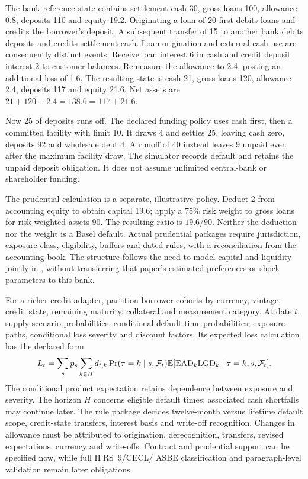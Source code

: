 The bank reference state contains settlement cash 30, gross loans 100,
allowance 0.8, deposits 110 and equity 19.2. Originating a loan of 20 first
debits loans and credits the borrower's deposit. A subsequent transfer of 15
to another bank debits deposits and credits settlement cash. Loan origination
and external cash use are consequently distinct events. Receive loan interest
6 in cash and credit deposit interest 2 to customer balances. Remeasure the
allowance to 2.4, posting an additional loss of 1.6. The resulting state is
cash 21, gross loans 120, allowance 2.4, deposits 117 and equity 21.6.
Net assets are $21+120-2.4=138.6=117+21.6$.

Now 25 of deposits runs off. The declared funding policy uses cash first,
then a committed facility with limit 10. It draws 4 and settles 25, leaving
cash zero, deposits 92 and wholesale debt 4. A runoff of 40 instead leaves
9 unpaid even after the maximum facility draw. The simulator records default
and retains the unpaid deposit obligation. It does not assume unlimited
central-bank or shareholder funding.

The prudential calculation is a separate, illustrative policy. Deduct 2 from
accounting equity to obtain capital 19.6; apply a 75\% risk weight to gross
loans for risk-weighted assets 90. The resulting ratio is $19.6/90$.
Neither the deduction nor the weight is a Basel default. Actual prudential
packages require jurisdiction, exposure class, eligibility, buffers and dated
rules, with a reconciliation from the accounting book. The structure follows
the need to model capital and liquidity jointly in
\citet[Section 2]{behn2019}, without transferring that paper's estimated
preferences or shock parameters to this bank.

For a richer credit adapter, partition borrower cohorts by currency, vintage,
credit state, remaining maturity, collateral and measurement category. At date
$t$, supply scenario probabilities, conditional default-time probabilities,
exposure paths, conditional loss severity and discount factors. Its expected
loss calculation has the declared form
\[
 L_t=\sum_s p_s\sum_{k\in H}
  d_{t,k}\Pr(\tau=k\mid s,\mathcal F_t)
  \mathbb{E}[\mathrm{EAD}_k\mathrm{LGD}_k\mid\tau=k,s,\mathcal F_t].
\]
The conditional product expectation retains dependence between exposure and
severity. The horizon $H$ concerns eligible default times; associated cash
shortfalls may continue later. The rule package decides twelve-month versus
lifetime default scope, credit-state transfers, interest basis and write-off
recognition. Changes in allowance must be attributed to origination,
derecognition, transfers, revised expectations, currency and write-offs.
Contract and prudential support can be specified now, while full IFRS~9/CECL/
ASBE classification and paragraph-level validation remain later obligations.



